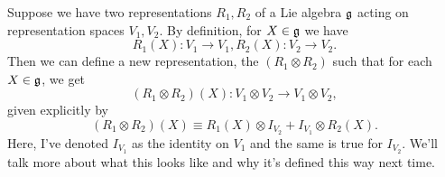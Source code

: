 \begin{defn}
Suppose we have two representations $R_1,R_2$ of a Lie algebra $\mathfrak{g}$ acting on representation spaces $V_1,V_2$. By definition, for $X\in\mathfrak{g}$ we have
$$R_1(X):V_1\to V_1, R_2(X):V_2\to V_2.$$
Then we can define a new representation, the  $(R_1\otimes R_2)$ such that for each $X\in \mathfrak{g}$, we get
$$(R_1\otimes R_2)(X):V_1 \otimes V_2 \to V_1 \otimes V_2,$$
given explicitly by
$$(R_1\otimes R_2)(X)\equiv R_1(X) \otimes I_{V_2} + I_{V_1} \otimes R_2(X).$$
Here, I've denoted $I_{V_1}$ as the identity on $V_1$ and the same is true for $I_{V_2}$. We'll talk more about what this looks like and why it's defined this way next time.
\end{defn}